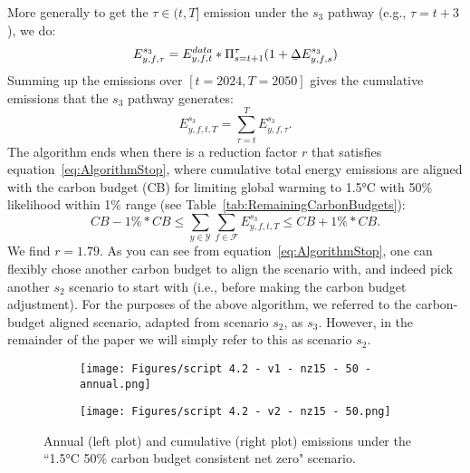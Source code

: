 \documentclass[11pt,a4paper,table,xcdraw]{article}
\newcommand{\ubar}[1]{\underaccent{\bar}{#1}}
\begin{document}
More generally to get the $\tau\in (t,T]$ emission under the $s_3$ pathway (e.g., $\tau=t+3$), we do:
\begin{equation}
    E^{s_3}_{y,f,\tau} = E^{data}_{y,f,t} * \Pi_{s=t+1}^\tau (1+ \ubar{\Delta} E^{s_{3}}_{y,f,s})
\end{equation}
Summing up the emissions over $[t=2024,T=2050]$ gives the cumulative emissions that the $s_3$ pathway generates:
\begin{equation}
    E^{s_3}_{y,f,t,T} = \sum_{\tau=t}^T E^{s_3}_{y,f,\tau}.
\end{equation}
The algorithm ends when there is a reduction factor $r$ that satisfies equation~\ref{eq:AlgorithmStop}, where cumulative total energy emissions are aligned with the carbon budget (CB) for limiting global warming to 1.5°C with 50\% likelihood within 1\% range (see Table~\ref{tab:RemainingCarbonBudgets}):
\begin{equation}
       CB - 1\% * CB \leq \sum_{y \in \mathcal{Y}} \sum_{f \in \mathcal{F}} E^{s_3}_{y,f,t,T} \leq CB + 1\% * CB .\label{eq:AlgorithmStop}
\end{equation}
We find $r=1.79$. As you can see from equation~\ref{eq:AlgorithmStop}, one can flexibly chose another carbon budget to align the scenario with, and indeed pick another $s_2$ scenario to start with (i.e., before making the carbon budget adjustment).\newline
\indent For the purposes of the above algorithm, we referred to the carbon-budget aligned scenario, adapted from scenario $s_2$, as $s_3$. However, in the remainder of the paper we will simply refer to this as scenario $s_2$.


\hspace{1cm}\newline \newline


\begin{figure}[H]
    \centering
    \begin{subfigure}{0.48\textwidth}
        \centering
\texttt{[image: Figures/script 4.2 - v1 - nz15 - 50 - annual.png]}
    \end{subfigure}
    \hfill
    \begin{subfigure}{0.48\textwidth}
        \centering
\texttt{[image: Figures/script 4.2 - v2 - nz15 - 50.png]}
    \end{subfigure}
     \caption{Annual (left plot) and cumulative (right plot) emissions under the ``1.5°C 50\% carbon budget consistent net zero" scenario.}
\end{figure}
\end{document}
